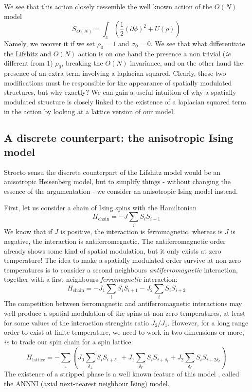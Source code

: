 We see that this action closely ressemble the well known action of the $O(N)$ model
\begin{equation}
S_{O(N)} = \int_x \left( \frac{1}{2}(\partial \phi)^2 + U(\rho) \right)
\end{equation}
Namely, we recover it if we set $\rho_0 = 1$ and $\sigma_0 = 0$. We see that what differentiate the Lifshitz and $O(N)$ action is on one hand the presence a non trivial (\textit{ie} different from 1) $\rho_0$, breaking the $O(N)$ invariance, and on the other hand the presence of an extra term involving a laplacian squared. Clearly, these two modifications must be responsible for the appearance of spatially modulated structures, but why exactly? 
We can gain a useful intuition of why a spatially modulated structure is closely linked to the existence of a laplacian squared term in the action by looking at a lattice version of our model. 

\subsection{A discrete counterpart: the anisotropic Ising model}

Strocto sensu the discrete counterpart of the Lifshitz model would be an anisotropic Heisenberg model, but to simplify things - without changing the essence of the argumentation - we consider an anisotropic Ising model instead.

First, let us consider a chain of Ising spins with the Hamiltonian
\begin{equation}
H_{\text{chain}} = - J \sum_i S_i S_{i+1}
\end{equation}
We know that if $J$ is positive, the interaction is ferromagnetic, whereas is $J$ is negative, the interaction is antiferromegnetic. 
The antiferromagnetic order already shows some kind of spatial modulation, but it only exists at zero temperature! 
The idea to make a spatially modulated order survive at non zero temperatures is to consider a second neighbours \textit{antiferromagnetic} interaction, together with a first neighbours \textit{ferromagnetic} interaction:
\begin{equation}
H_{\text{chain}} = - J_1 \sum_i S_i S_{i+1} - J_2 \sum_i S_i S_{i+2}
\end{equation}
 The competition between ferromagnetic and antiferromagnetic interactions may well produce a spatial modulation of the spins at non zero temperatures, at least for some values of the interaction strenghts ratio $J_2/J_1$. However, for a long range order to exist at finite temperature, we need to work in two dimensions or more, \textit{ie} to trade our spin chain for a spin lattice:
 \begin{equation}
 H_{\text{lattice}} = - \sum_i \left( J_0 \sum_{\delta_\perp} S_i S_{i+\delta_\perp} + J_1 \sum_{\delta_\sslash} S_i S_{i+\delta_\sslash} + J_2 \sum_{\delta_\sslash} S_i S_{i+2 \delta_\sslash} \right)
 \end{equation}
 The existence of a stripped phase is a well known feature of this model \cite{ANNNI}, called the ANNNI (axial next-nearest neighbour Ising) model.
 
